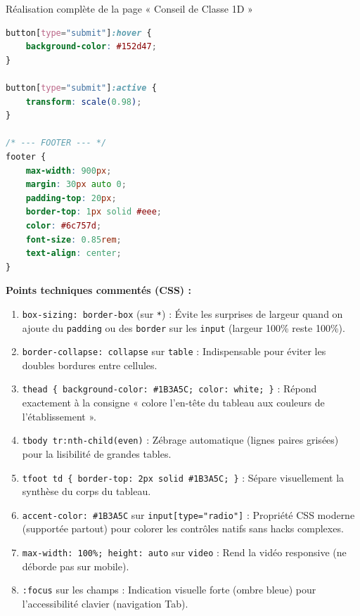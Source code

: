 \documentclass[11pt]{article}
\begin{document}
\begin{exoresolu}{Réalisation complète de la page « Conseil de Classe 1D »}
\begin{lstlisting}[language=CSS]
button[type="submit"]:hover {
    background-color: #152d47;
}

button[type="submit"]:active {
    transform: scale(0.98);
}

/* --- FOOTER --- */
footer {
    max-width: 900px;
    margin: 30px auto 0;
    padding-top: 20px;
    border-top: 1px solid #eee;
    color: #6c757d;
    font-size: 0.85rem;
    text-align: center;
}
\end{lstlisting}

\textbf{Points techniques commentés (CSS) :}
\begin{enumerate}
    \item \texttt{box-sizing: border-box} (sur \texttt{*}) : Évite les surprises de largeur quand on ajoute du \texttt{padding} ou des \texttt{border} sur les \texttt{input} (largeur 100\% reste 100\%).
    \item \texttt{border-collapse: collapse} sur \texttt{table} : Indispensable pour éviter les doubles bordures entre cellules.
    \item \texttt{thead \{ background-color: \#1B3A5C; color: white; \}} : Répond exactement à la consigne « colore l'en-tête du tableau aux couleurs de l'établissement ».
    \item \texttt{tbody tr:nth-child(even)} : Zébrage automatique (lignes paires grisées) pour la lisibilité de grandes tables.
    \item \texttt{tfoot td \{ border-top: 2px solid \#1B3A5C; \}} : Sépare visuellement la synthèse du corps du tableau.
    \item \texttt{accent-color: \#1B3A5C} sur \texttt{input[type="radio"]} : Propriété CSS moderne (supportée partout) pour colorer les contrôles natifs sans hacks complexes.
    \item \texttt{max-width: 100\%; height: auto} sur \texttt{video} : Rend la vidéo responsive (ne déborde pas sur mobile).
    \item \texttt{:focus} sur les champs : Indication visuelle forte (ombre bleue) pour l'accessibilité clavier (navigation Tab).
\end{enumerate}


\end{exoresolu}
\end{document}
